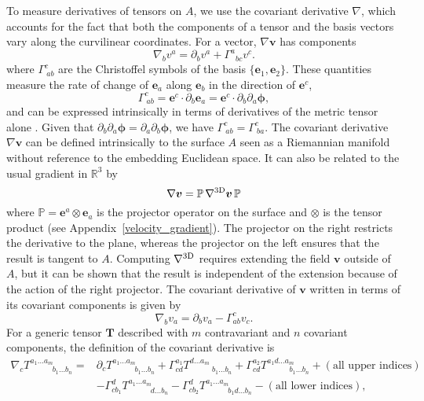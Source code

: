 To measure derivatives of tensors on $A$, we use the covariant derivative $\nabla$, which accounts for the fact that both the components of a tensor and the basis vectors vary along the curvilinear coordinates. For a vector, $\nabla\bm{v}$ has components
\begin{equation} \label{6_II}
	\nabla_b v^a = \partial_b v^a + \Gamma^a{}_{bc} v^c.
\end{equation}
where $\Gamma^c_{~ ab}$ are the Christoffel symbols of the basis $\{\bm{e}_1,\bm{e}_2\}$. These quantities  measure the rate of change of $\bm{e}_a$ along $\bm{e}_b$ in the direction of $\bm{e}^c$,
\begin{equation} \label{8_II}
	\Gamma^c_{~ ab} = \bm{e}^c\cdot \partial_b \bm{e}_a=\bm{e}^c\cdot \partial_b \partial_a \bm{\phi},
\end{equation}
and can be expressed intrinsically in terms of derivatives of the metric tensor alone \cite{Do_Carmo2016-kq}.
Given that $\partial_b \partial_a \bm{\phi}=\partial_a \partial_b \bm{\phi}$, we have $\Gamma^c_{~ ab}= \Gamma^c_{~ba}$. The covariant derivative
$\nabla\bm{v}$ can be defined intrinsically to the surface $A$ seen as a Riemannian manifold without reference to the embedding Euclidean space. It can also be related to the  usual gradient in $\mathbb{R}^3$ by
\begin{equation}\label{cov_der}
	\nabla \bm{v} = \mathbb{P}\,\nabla^{\rm 3D} \bm{v}\,\mathbb{P}
\end{equation}
where $\mathbb{P}=\bm{e}^a\otimes\bm{e}_a$ is the projector operator on the surface and $\otimes$ is the tensor product (see Appendix~\ref{velocity_gradient}). The projector on the right restricts the derivative to the plane, whereas the projector on the left ensures that the result is tangent to $A$. Computing $\nabla^{\rm 3D}$ requires extending the field $\bm{v}$ outside of $A$, but it can be shown that the result is independent of the extension because of the action of the right projector. 
The covariant derivative of $\bm{v}$ written in terms of its covariant components is given by
\begin{equation} \label{6_II_b}
	\nabla_b v_a = \partial_b v_a - \Gamma^c_{ab} v_c.
\end{equation}
For a generic tensor $\bm{T}$ described with $m$ contravariant and $n$ covariant components, the definition of the covariant derivative is
\begin{align} \label{7_II}
	\nabla_c T^{a_1\dots a_m}_{~ \, \, \, \, \, \, \, \, \, \, \, \, \, \, \, \,   b_1 \dots b_n} =  {}&  \partial_c T^{a_1 \dots a_m}_{~ \, \, \, \, \, \, \, \, \, \, \, \, \, \, \, \, b_1 \dots b_n}  + \Gamma^{a_1}_{cd} T^{d\dots a_m}_{~ \, \, \, \, \, \, \, \, \, \, \, \, \, \, \, \,   b_1 \dots b_n} + \Gamma^{a_2}_{cd} T^{a_1 d\dots a_m}_{~ \, \, \, \, \, \, \, \, \, \, \, \, \, \, \, \,   b_1 \dots b_n} + \left(\text{all upper indices}\right)   \nonumber\\ & - \Gamma^d_{c b_1} T^{a_1 \dots a_m}_{~ \, \, \, \, \, \, \, \, \, \, \, \, \, \, \, \, d \dots b_n} -  \Gamma^d_{c b_2} T^{a_1 \dots a_m}_{~ \, \, \, \, \, \, \, \, \, \, \, \, \, \, \, \, b_1 d \dots b_n}  - \left(\text{all lower indices}\right),
\end{align}
